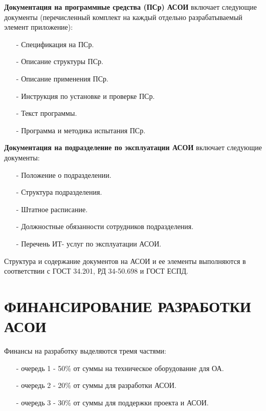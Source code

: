 \documentclass[12pt, a4paper, simple]{eskdtext}
\begin{document}
    \textbf{Документация на программные средства (ПСр) АСОИ} включает следующие документы
    (перечислен­ный комплект на каждый отдельно разрабатываемый элемент приложение):
    \begin{enumerate}
        \item[-] Спецификация на ПСр.
        \item[-] Описание структуры ПСр.
        \item[-] Описание применения ПСр.
        \item[-] Инструкция по установке и проверке ПСр.
        \item[-] Текст программы.
        \item[-] Программа и методика испытания ПСр.
    \end{enumerate}
    
    \textbf{Документация на подразделение по эксплуатации АСОИ} включает следующие документы:
    \begin{enumerate}
        \item[-] Положение о подразделении.
        \item[-] Структура подразделения.
        \item[-] Штатное расписание.
        \item[-] Должностные обязанности сотрудников подразделения.
        \item[-] Перечень ИТ- услуг по эксплуатации АСОИ.
    \end{enumerate}
    
    Структура и содержание документов на АСОИ и ее элементы выполняются в соответствии
    с ГОСТ 34.201, РД 34-50.698 и ГОСТ ЕСПД.

    \section*{ФИНАНСИРОВАНИЕ РАЗРАБОТКИ АСОИ}

    Финансы на разработку выделяются тремя частями:
    \begin{enumerate}
        \item[-] очередь 1 - 50\% от суммы на техническое оборудование для ОА.
        \item[-] очередь 2 - 20\% от суммы для разработки АСОИ.
        \item[-] очередь 3 - 30\% от суммы для поддержки проекта и АСОИ.
    \end{enumerate}
\end{document}
